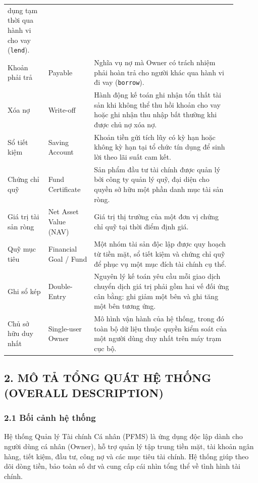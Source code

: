 \documentclass[11pt,a4paper]{article}
\begin{document}
{\begin{longtable}[]{|>{\raggedright\arraybackslash}p{0.16\linewidth}|>{\raggedright\arraybackslash}p{0.18\linewidth}|>{\raggedright\arraybackslash}p{0.56\linewidth}|}
dụng tạm thời qua hành vi cho vay (\texttt{lend}). \\
Khoản phải trả & Payable & Nghĩa vụ nợ mà Owner có trách nhiệm phải hoàn
trả cho người khác qua hành vi đi vay (\texttt{borrow}). \\
Xóa nợ & Write-off & Hành động kế toán ghi nhận tổn thất tài sản khi
không thể thu hồi khoản cho vay hoặc ghi nhận thu nhập bất thường khi
được chủ nợ xóa nợ. \\
Sổ tiết kiệm & Saving Account & Khoản tiền gửi tích lũy có kỳ hạn hoặc
không kỳ hạn tại tổ chức tín dụng để sinh lời theo lãi suất cam kết. \\
Chứng chỉ quỹ & Fund Certificate & Sản phẩm đầu tư tài chính được quản
lý bởi công ty quản lý quỹ, đại diện cho quyền sở hữu một phần danh mục
tài sản ròng. \\
Giá trị tài sản ròng & Net Asset Value (NAV) & Giá trị thị trường của
một đơn vị chứng chỉ quỹ tại thời điểm định giá. \\
Quỹ mục tiêu & Financial Goal / Fund & Một nhóm tài sản độc lập được quy
hoạch từ tiền mặt, sổ tiết kiệm và chứng chỉ quỹ để phục vụ một mục đích
tài chính cụ thể. \\
Ghi sổ kép & Double-Entry & Nguyên lý kế toán yêu cầu mỗi giao dịch
chuyển dịch giá trị phải gồm hai vế đối ứng cân bằng: ghi giảm một bên
và ghi tăng một bên tương ứng. \\
Chủ sở hữu duy nhất & Single-user Owner & Mô hình vận hành của hệ thống,
trong đó toàn bộ dữ liệu thuộc quyền kiểm soát của một người dùng duy
nhất trên máy trạm cục bộ. \\
\end{longtable}
}

\clearpage
\subsection{2. MÔ TẢ TỔNG QUÁT HỆ THỐNG (OVERALL
DESCRIPTION)}\label{2-muxf4-tux1ea3-tux1ed5ng-quuxe1t-hux1ec7-thux1ed1ng-overall-description}

\subsubsection{2.1 Bối cảnh hệ
thống}\label{21-bux1ed1i-cux1ea3nh-hux1ec7-thux1ed1ng}

Hệ thống Quản lý Tài chính Cá nhân (PFMS) là ứng dụng độc lập dành cho
người dùng cá nhân (Owner), hỗ trợ quản lý tập trung tiền mặt, tài khoản
ngân hàng, tiết kiệm, đầu tư, công nợ và các mục tiêu tài chính. Hệ thống
giúp theo dõi dòng tiền, bảo toàn số dư và cung cấp cái nhìn tổng thể về
tình hình tài chính.
\end{document}
